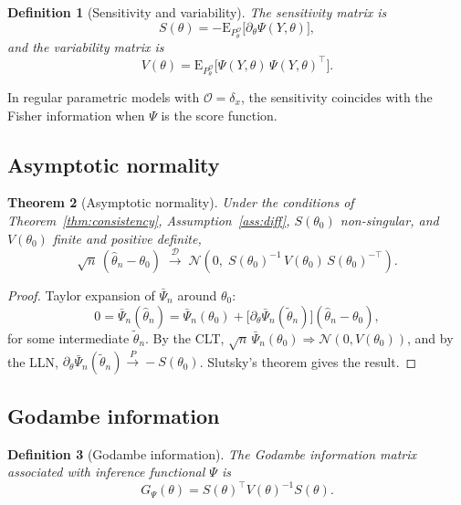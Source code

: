 \documentclass[11pt,a4paper]{article}
\newtheorem{theorem}{Theorem}[section]
\newtheorem{definition}[theorem]{Definition}
\newcommand{\E}{\mathrm{E}}
\begin{document}
\begin{definition}[Sensitivity and variability]\label{def:SV}
The \emph{sensitivity matrix} is
\[
S(\theta)
= -\E_{P_\theta^{\mathcal O}}\!\bigl[\partial_\theta \Psi(Y, \theta)\bigr],
\]
and the \emph{variability matrix} is
\[
V(\theta)
= \E_{P_\theta^{\mathcal O}}\!\bigl[\Psi(Y, \theta)\,\Psi(Y, \theta)^\top\bigr].
\]
\end{definition}

In regular parametric models with $\mathcal O = \delta_x$, the sensitivity
coincides with the Fisher information when $\Psi$ is the score function.

\subsection{Asymptotic normality}\label{subsec:AN}

\begin{theorem}[Asymptotic normality]\label{thm:AN}
Under the conditions of Theorem~\ref{thm:consistency},
Assumption~\ref{ass:diff}, $S(\theta_0)$ non-singular, and
$V(\theta_0)$ finite and positive definite,
\[
\sqrt{n}\,(\hat\theta_n - \theta_0)
\;\xrightarrow{\;\mathcal D\;}\;
\mathcal N\!\left(0,\;
S(\theta_0)^{-1}\, V(\theta_0)\, S(\theta_0)^{-\top}
\right).
\]
\end{theorem}

\begin{proof}
Taylor expansion of $\bar\Psi_n$ around $\theta_0$:
\[
0 = \bar\Psi_n(\hat\theta_n)
= \bar\Psi_n(\theta_0)
+ \bigl[\partial_\theta \bar\Psi_n(\tilde\theta_n)\bigr]
  (\hat\theta_n - \theta_0),
\]
for some intermediate $\tilde\theta_n$.  By the CLT,
$\sqrt{n}\,\bar\Psi_n(\theta_0) \Rightarrow \mathcal N(0, V(\theta_0))$,
and by the LLN,
$\partial_\theta \bar\Psi_n(\tilde\theta_n) \xrightarrow{P} -S(\theta_0)$.
Slutsky's theorem gives the result.
\end{proof}

\subsection{Godambe information}\label{subsec:godambe}

\begin{definition}[Godambe information]\label{def:godambe}
The \emph{Godambe information matrix} associated with inference functional
$\Psi$ is
\[
G_\Psi(\theta)
= S(\theta)^\top V(\theta)^{-1} S(\theta).
\]
\end{definition}
\end{document}
